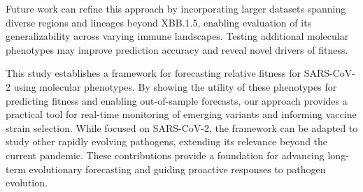 Future work can refine this approach by incorporating larger datasets spanning diverse regions and lineages beyond XBB.1.5, enabling evaluation of its generalizability across varying immune landscapes. Testing additional molecular phenotypes may improve prediction accuracy and reveal novel drivers of fitness.

This study establishes a framework for forecasting relative fitness for SARS-CoV-2 using molecular phenotypes.
By showing the utility of these phenotypes for predicting fitness and enabling out-of-sample forecasts, our approach provides a practical tool for real-time monitoring of emerging variants and informing vaccine strain selection. 
While focused on SARS-CoV-2, the framework can be adapted to study other rapidly evolving pathogens, extending its relevance beyond the current pandemic.
These contributions provide a foundation for advancing long-term evolutionary forecasting and guiding proactive responses to pathogen evolution.










